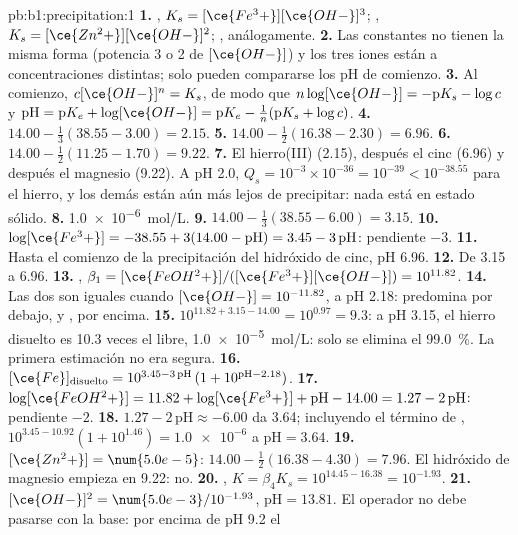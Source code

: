 \begin{solution}{pb:b1:precipitation:1}
\textbf{1.} , $K_s = [\ce{Fe^3+}][\ce{OH-}]^3$;
, $K_s = [\ce{Zn^2+}][\ce{OH-}]^2$;
, análogamente.
\textbf{2.} Las constantes no tienen la misma forma (potencia 3 o 2 de
$[\ce{OH-}]$) y los tres iones están a concentraciones distintas; solo
pueden compararse los pH de comienzo.
\textbf{3.} Al comienzo, $c[\ce{OH-}]^n = K_s$, de modo que
$n\log[\ce{OH-}] =
-\mathrm{p}K_s - \log c$ y $\mathrm{pH} = \mathrm{p}K_e +
\log[\ce{OH-}] = \mathrm{p}K_e - \frac1n(\mathrm{p}K_s + \log c)$.
\textbf{4.} $14.00 - \frac13(38.55 - 3.00) = 2.15$.
\textbf{5.} $14.00 - \frac12(16.38 - 2.30) = 6.96$.
\textbf{6.} $14.00 - \frac12(11.25 - 1.70) = 9.22$.
\textbf{7.} El hierro(III) (2.15), después el cinc (6.96) y después el
magnesio (9.22). A pH 2.0, $Q_s = 10^{-3} \times 10^{-36} = 10^{-39} < 10^{-38.55}$
para el hierro, y los demás están aún más lejos de precipitar: nada está
en estado sólido.
\textbf{8.} \qty{1.0e-6}{mol/L}.
\textbf{9.} $14.00 - \frac13(38.55 - 6.00) = 3.15$.
\textbf{10.} $\log[\ce{Fe^3+}] = -38.55 + 3(14.00 - \mathrm{pH}) = 3.45 -
3\,\mathrm{pH}$: pendiente $-3$.
\textbf{11.} Hasta el comienzo de la precipitación del hidróxido de cinc,
pH 6.96.
\textbf{12.} De 3.15 a 6.96.
\textbf{13.} , $\beta_1 =
[\ce{FeOH^2+}]/([\ce{Fe^3+}][\ce{OH-}]) = 10^{11.82}$.
\textbf{14.} Las dos son iguales cuando $[\ce{OH-}] = 10^{-11.82}$, a pH
2.18:  predomina por debajo, y , por encima.
\textbf{15.} $10^{11.82 + 3.15 - 14.00} = 10^{0.97} = 9.3$: a pH 3.15, el
hierro disuelto es 10.3 veces el  libre, \qty{1.0e-5}{mol/L}:
solo se elimina el \qty{99.0}{\percent}. La primera estimación no era
segura.
\textbf{16.} $[\ce{Fe}]_{\mathrm{disuelto}} = 10^{3.45 - 3\,\mathrm{pH}}\,
(1 + 10^{\mathrm{pH} - 2.18})$.
\textbf{17.} $\log[\ce{FeOH^2+}] = 11.82 + \log[\ce{Fe^3+}] + \mathrm{pH} -
14.00 = 1.27 - 2\,\mathrm{pH}$: pendiente $-2$.
\textbf{18.} $1.27 - 2\,\mathrm{pH} \approx -6.00$ da 3.64; incluyendo el
término de , $10^{3.45 - 10.92}(1 + 10^{1.46}) =
\num{1.0e-6}$ a $\mathrm{pH} = 3.64$.
\textbf{19.} $[\ce{Zn^2+}] = \num{5.0e-5}$: $14.00 - \frac12(16.38 - 4.30) =
7.96$. El hidróxido de magnesio empieza en 9.22: no.
\textbf{20.} , $K = \beta_4 K_s =
10^{14.45 - 16.38} = 10^{-1.93}$.
\textbf{21.} $[\ce{OH-}]^2 = \num{5.0e-3}/10^{-1.93}$, $\mathrm{pH} =
13.81$. El operador no debe pasarse con la base: por encima de pH 9.2 el

\end{solution}
